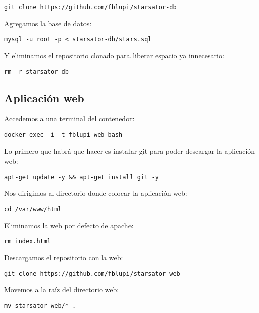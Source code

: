 \begin{lstlisting}
git clone https://github.com/fblupi/starsator-db
\end{lstlisting}

Agregamos la base de datos:

\begin{lstlisting}
mysql -u root -p < starsator-db/stars.sql
\end{lstlisting}

Y eliminamos el repositorio clonado para liberar espacio ya innecesario:

\begin{lstlisting}
rm -r starsator-db
\end{lstlisting}

\subsection{Aplicación web}

Accedemos a una terminal del contenedor:

\begin{lstlisting}
docker exec -i -t fblupi-web bash
\end{lstlisting}

Lo primero que habrá que hacer es instalar git para poder descargar la aplicación web:

\begin{lstlisting}
apt-get update -y && apt-get install git -y
\end{lstlisting}

Nos dirigimos al directorio donde colocar la aplicación web:

\begin{lstlisting}
cd /var/www/html
\end{lstlisting}

Eliminamos la web por defecto de apache:

\begin{lstlisting}
rm index.html
\end{lstlisting}

Descargamos el repositorio con la web:

\begin{lstlisting}
git clone https://github.com/fblupi/starsator-web
\end{lstlisting}

Movemos a la raíz del directorio web:

\begin{lstlisting}
mv starsator-web/* .
\end{lstlisting}

